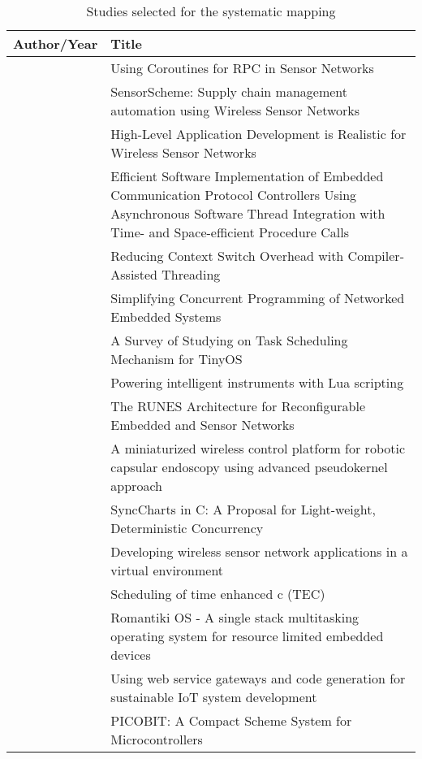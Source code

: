 \begin{longtable}[c]{ l p{8cm} } 
	\caption{Studies selected for the systematic mapping
	\label{dataset}}\\
	\hline

Author/Year & Title \\ \hline
\endhead

 \cite{Cohen2007b} & Using Coroutines for RPC in Sensor Networks \\
\cite{Evers2007} & SensorScheme: Supply chain management automation using Wireless Sensor Networks \\
\cite{Karpin2007} & High-Level Application Development is Realistic for Wireless Sensor Networks \\
\cite{Kumar2007} & Efficient Software Implementation of Embedded Communication Protocol Controllers Using Asynchronous Software Thread Integration with Time- and Space-efficient Procedure Calls \\
\cite{Jaaskelainen2008} & Reducing Context Switch Overhead with Compiler-Assisted Threading \\
\cite{Khezri2008} & Simplifying Concurrent Programming of Networked Embedded Systems \\
\cite{Yu2008} & A Survey of Studying on Task Scheduling Mechanism for TinyOS \\
\cite{Clark2009} & Powering intelligent instruments with Lua scripting \\
\cite{Oldewurtel2009} & The RUNES Architecture for Reconfigurable Embedded and Sensor Networks \\
\cite{Susilo2009} & A miniaturized wireless control platform for robotic capsular endoscopy using advanced pseudokernel approach \\
\cite{VonHanxleden2009} & SyncCharts in C: A Proposal for Light-weight, Deterministic Concurrency \\
\cite{Boers2010} & Developing wireless sensor network applications in a virtual environment \\
\cite{Fritzsche2010} & Scheduling of time enhanced c (TEC) \\
\cite{Glistvain2010} & Romantiki OS - A single stack multitasking operating system for resource limited embedded devices \\
\cite{Riedel2010} & Using web service gateways and code generation for sustainable IoT system development \\
\cite{St-Amour2010} & PICOBIT: A Compact Scheme System for Microcontrollers \\

\end{longtable}
